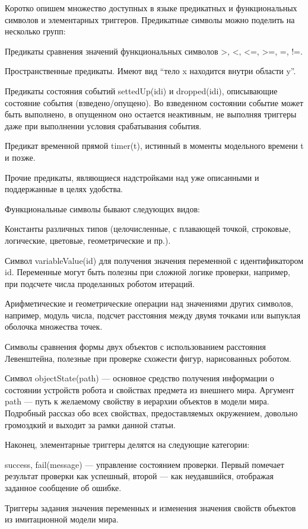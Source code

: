 \documentclass[conference]{IEEEtran}
\begin{document}
Коротко опишем множество доступных в языке предикатных и функциональных символов и элементарных триггеров. Предикатные символы можно поделить на несколько групп:

Предикаты сравнения значений функциональных символов >, <, <=, >=, =, !=.

Пространственные предикаты. Имеют вид “тело x находится внутри области y”.

Предикаты состояния событий settedUp(idi) и dropped(idi), описывающие состояние события (взведено/опущено). Во взведенном состоянии событие может быть выполнено, в опущенном оно остается неактивным, не выполняя триггеры даже при выполнении условия срабатывания события.

Предикат временной прямой timer(t), истинный в моменты модельного времени t и позже.

Прочие предикаты, являющиеся надстройками над уже описанными и поддержанные в целях удобства.

Функциональные символы бывают следующих видов:

Константы различных типов (целочисленные, с плавающей точкой, строковые, логические, цветовые, геометрические и пр.).

Символ variableValue(id) для получения значения переменной с идентификатором id. Переменные могут быть полезны при сложной логике проверки, например, при подсчете числа проделанных роботом итераций.

Арифметические и геометрические операции над значениями других символов, например, модуль числа, подсчет расстояния между двумя точками или выпуклая оболочка множества точек.

Символы сравнения формы двух объектов с использованием расстояния Левенштейна, полезные при проверке схожести фигур, нарисованных роботом.

Символ objectState(path) --- основное средство получения информации о состоянии устройств робота и свойствах предмета из внешнего мира. Аргумент path --- путь к желаемому свойству в иерархии объектов в модели мира. Подробный рассказ обо всех свойствах, предоставляемых окружением, довольно громоздкий и выходит за рамки данной статьи.

Наконец, элементарные триггеры делятся на следующие категории:

success, fail(message) --- управление состоянием проверки. Первый помечает результат проверки как успешный, второй --- как неудавшийся, отображая заданное сообщение об ошибке.

Триггеры задания значения переменных и изменения значения свойств объектов из имитационной модели мира.
\end{document}
